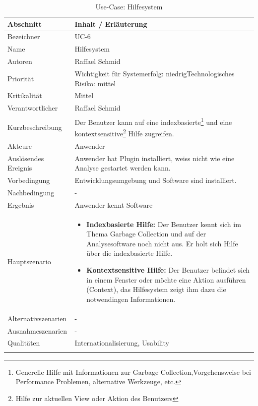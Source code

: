 \begin{longtable}{|p{4cm}|p{10.5cm}|}
\hline
   \textbf{Abschnitt} & \textbf{Inhalt / Erläuterung} \\\hline
   Bezeichner & UC-6\\\hline
   Name & Hilfesystem\\\hline
   Autoren & Raffael Schmid\\\hline
   Priorität & Wichtigkeit für Systemerfolg: niedrig\newline Technologisches Risiko: mittel\\\hline
   Kritikalität & Mittel\\\hline
   Verantwortlicher & Raffael Schmid\\\hline
   Kurzbeschreibung & Der Benutzer kann auf eine indexbasierte\footnote{Generelle Hilfe mit Informationen zur Garbage Collection,Vorgehensweise bei Performance Problemen, alternative Werkzeuge, etc.} und eine kontextsensitive\footnote{Hilfe zur aktuellen View oder Aktion des Benutzers} Hilfe zugreifen. \\\hline
   Akteure & Anwender\\\hline
   Auslösendes Ereignis & Anwender hat Plugin installiert, weiss nicht wie eine Analyse gestartet werden kann.\\\hline
   Vorbedingung & Entwicklungsumgebung und Software sind installiert.\\\hline
   Nachbedingung & -\\\hline
   Ergebnis & Anwender kennt Software\\\hline
   Hauptszenario &	\begin{itemize}
		\item \textbf{Indexbasierte Hilfe: } Der Benutzer kennt sich im Thema Garbage Collection und auf der Analysesoftware noch nicht aus. Er holt sich Hilfe über die indexbasierte Hilfe. 
		\item \textbf{Kontextsensitive Hilfe: } Der Benutzer befindet sich in einem Fenster oder möchte eine Aktion ausführen (Context), das Hilfesystem zeigt ihm dazu die notwendingen Informationen.
	\end{itemize}
	\\\hline
   Alternativszenarien & -\\\hline
   Ausnahmeszenarien & -\\\hline
   Qualitäten & Internationalisierung, Usability\\\hline
\caption{Use-Case: Hilfesystem}
\end{longtable}

